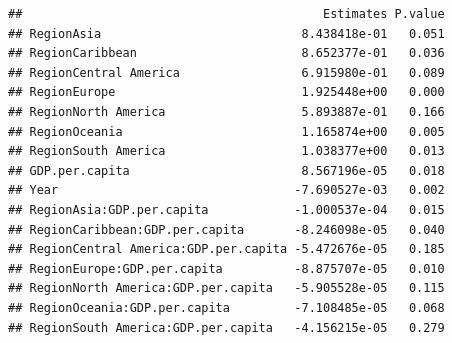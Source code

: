 \documentclass[11pt,]{article}
\newenvironment{Shaded}{\begin{snugshade}}{\end{snugshade}}
\newcommand{\CommentTok}[1]{\textcolor[rgb]{0.56,0.35,0.01}{\textit{#1}}}
\newcommand{\FloatTok}[1]{\textcolor[rgb]{0.00,0.00,0.81}{#1}}
\newcommand{\KeywordTok}[1]{\textcolor[rgb]{0.13,0.29,0.53}{\textbf{#1}}}
\newcommand{\NormalTok}[1]{#1}
\newcommand{\OperatorTok}[1]{\textcolor[rgb]{0.81,0.36,0.00}{\textbf{#1}}}
\newcommand{\StringTok}[1]{\textcolor[rgb]{0.31,0.60,0.02}{#1}}
\begin{document}
\begin{Shaded}
\end{Shaded}

\begin{verbatim}
##                                          Estimates P.value
## RegionAsia                            8.438418e-01   0.051
## RegionCaribbean                       8.652377e-01   0.036
## RegionCentral America                 6.915980e-01   0.089
## RegionEurope                          1.925448e+00   0.000
## RegionNorth America                   5.893887e-01   0.166
## RegionOceania                         1.165874e+00   0.005
## RegionSouth America                   1.038377e+00   0.013
## GDP.per.capita                        8.567196e-05   0.018
## Year                                 -7.690527e-03   0.002
## RegionAsia:GDP.per.capita            -1.000537e-04   0.015
## RegionCaribbean:GDP.per.capita       -8.246098e-05   0.040
## RegionCentral America:GDP.per.capita -5.472676e-05   0.185
## RegionEurope:GDP.per.capita          -8.875707e-05   0.010
## RegionNorth America:GDP.per.capita   -5.905528e-05   0.115
## RegionOceania:GDP.per.capita         -7.108485e-05   0.068
## RegionSouth America:GDP.per.capita   -4.156215e-05   0.279
\end{verbatim}
\end{document}
